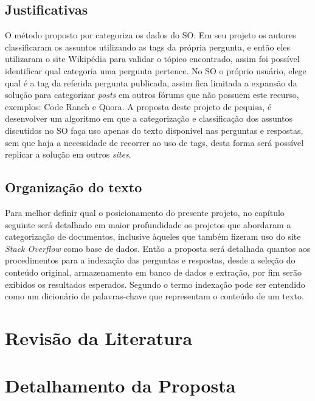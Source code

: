 \documentclass[10pt,a4paper,final]{article}
\begin{document}
    \subsection{Justificativas}

O método proposto por \cite{Arash2016} categoriza os dados do SO. Em seu projeto os autores classificaram os assuntos utilizando as tags da própria pergunta, e então eles utilizaram o site Wikipédia para validar o tópico encontrado, assim foi possível identificar qual categoria uma pergunta pertence. No SO o próprio usuário, elege qual é a tag da referida pergunta publicada, assim fica limitada a expansão da solução para categorizar \textit{posts} em outros fórums que não possuem este recurso, exemplos: Code Ranch e Quora.
\newline
\newline
A proposta deste projeto de pequisa, é desenvolver um algoritmo em que a categorização e classificação dos assuntos discutidos no SO faça uso apenas do texto disponível nas perguntas e respostas, sem que haja a necessidade de recorrer ao uso de tags, desta forma será possível replicar a solução em outros \textit{sites}.

   \subsection{Organização do texto}

Para melhor definir qual o posicionamento do presente projeto, no capítulo seguinte será detalhado em maior profundidade os projetos que abordaram a categorização de documentos, inclusive àqueles que também fizeram uso do site \textit{Stack Overflow} como base de dados. Então a proposta será detalhada quantos aos procedimentos para a indexação das perguntas e respostas, desde a seleção do conteúdo original, armazenamento em banco de dados e extração, por fim serão exibidos os resultados esperados. Segundo \cite{Kaleta2014} o termo indexação pode ser entendido como um dicionário de palavras-chave que representam o conteúdo de um texto.	

 \section{Revisão da Literatura}
   


 \section{Detalhamento da Proposta}
\end{document}

